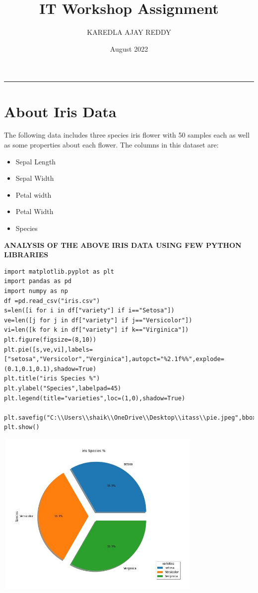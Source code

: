 \documentclass[12pt,a4paper]{article}
\title{IT Workshop Assignment }
\author{KAREDLA AJAY REDDY}
\affil{B191404}
\affil{CS123-C5}
\date{August 2022}
\begin{document}
\maketitle\vskip-15pt\hrule\vskip15pt


\section{About Iris Data}
The following data includes three species iris flower with 50 samples each as well as
some properties about each flower.
The columns in this dataset are:
\begin{itemize}
\color{brown}
\item Sepal Length
\color{red}
\item Sepal Width
\color{cyan}
\item Petal width
\color{lime}
\item Petal Width
\color{teal}
\item Species
\end{itemize}

\textbf{ANALYSIS OF THE ABOVE IRIS DATA USING FEW PYTHON LIBRARIES}



\begin{verbatim}
import matplotlib.pyplot as plt
import pandas as pd
import numpy as np
df =pd.read_csv("iris.csv")
s=len([i for i in df["variety"] if i=="Setosa"])
ve=len([j for j in df["variety"] if j=="Versicolor"])
vi=len([k for k in df["variety"] if k=="Virginica"])
plt.figure(figsize=(8,10))
plt.pie([s,ve,vi],labels=["setosa","Versicolor","Verginica"],autopct="%2.1f%%",explode=(0.1,0.1,0.1),shadow=True)
plt.title("iris Species %")
plt.ylabel("Species",labelpad=45)
plt.legend(title="varieties",loc=(1,0),shadow=True)

plt.savefig("C:\\Users\\shaik\\OneDrive\\Desktop\\itass\\pie.jpeg",bbox_inches="tight",pad_inches=0.5)
plt.show()
\end{verbatim}

\includegraphics[width=10cm, height=8cm]{pie.jpeg}
\end{document}
